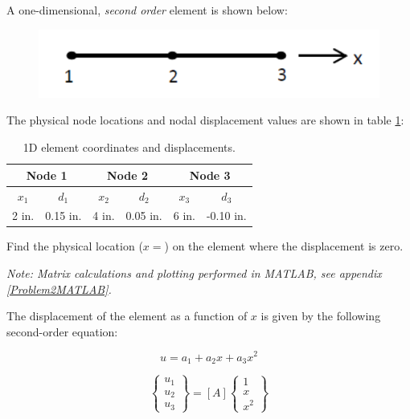\documentclass[../main.tex]{subfiles}
\begin{document}

A one-dimensional, \textit{second order} element is shown below:

\begin{figure}[h!]
    \centering
    \includegraphics[scale=0.4]{../../images/problem_2/1D_element}
\end{figure}

The physical node locations and nodal displacement values are shown in table \ref{1D_el}:

\begin{table}[h!]
    \centering
    \begin{tabular}{|c|c|c|c|c|c|}
    \hline
    \multicolumn{2}{|c|}{\textbf{Node 1}} & \multicolumn{2}{c|}{\textbf{Node 2}} & \multicolumn{2}{c|}{\textbf{Node 3}} \\ \hline
    \(x_1\) & \(d_1\) & \(x_2\) & \(d_2\) & \(x_3\) & \(d_3\) \\ \hline
    2 in. & 0.15 in. & 4 in. & 0.05 in. & 6 in. & -0.10 in. \\\hline
    \end{tabular}
    \caption{1D element coordinates and displacements.}
    \label{1D_el}
\end{table}

Find the physical location (\(x=\)) on the element where the displacement is zero.

\solution{}

\textit{Note: Matrix calculations and plotting performed in MATLAB, see appendix \ref{Problem2MATLAB}.}

The displacement of the element as a function of \(x\) is given by the following second-order equation:

\[
    u = a_1 + a_2x + a_3x^2
\]

\[
    \begin{Bmatrix}
        u_1 \\ u_2 \\u_3
    \end{Bmatrix}
     = [A]
     \begin{Bmatrix}
        1 \\ x \\x^2
    \end{Bmatrix}
\]
\end{document}
